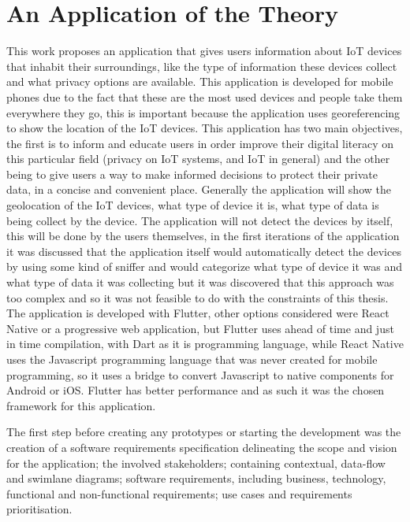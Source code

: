 %
%
\section{An Application of the Theory}
\label{section:stage2}

This work proposes an application that gives users information about IoT
devices that inhabit their surroundings, like the type of information these devices
collect and what privacy options are available. This application is developed
for mobile phones due to the fact that these are the most used devices
and people take them everywhere they go, this is important because the application
uses georeferencing to show the location of the IoT devices. This application
has two main objectives, the first is to inform and educate users in order improve
their digital literacy on this particular field (privacy on IoT systems, and
IoT in general) and the other being to give users a way to make informed decisions
to protect their private data, in a concise and convenient place. Generally
the application will show the geolocation of the IoT devices, what type of
device it is, what type of data is being collect by the device. The application
will not detect the devices by itself, this will be done by the users themselves,
in the first iterations of the application it was discussed that the application
itself would automatically detect the devices by using some kind of sniffer
and would categorize what type of device it was and what type of data it
was collecting but it was discovered that this approach was too complex and
so it was not feasible to do with the constraints of this thesis. The application
is developed with Flutter, other options considered were React Native or a
progressive web application, but Flutter uses ahead of time and just in time
compilation, with Dart as it is programming language, while React Native uses
the Javascript programming language that was never created for mobile programming,
so it uses a bridge to convert Javascript to native components for Android
or iOS. Flutter has better performance and as such it was the chosen framework
for this application.

The first step before creating any prototypes or starting the development was
the creation of a software requirements specification
delineating the scope and vision for the application; the involved stakeholders;
containing contextual, data-flow and swimlane diagrams; software requirements, including
business, technology, functional and non-functional requirements; use cases
and requirements prioritisation.

